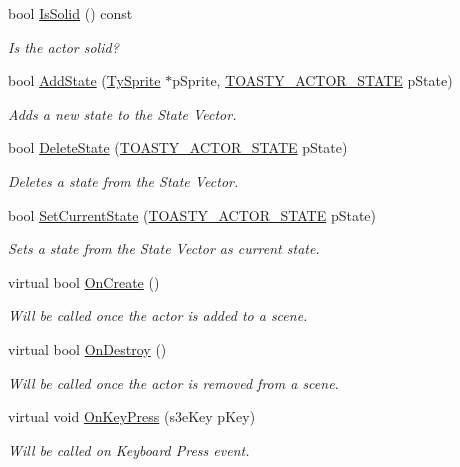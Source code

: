 \begin{DoxyCompactItemize}
bool \hyperlink{class_i_ty_actor_a5c1f9e77b0e5903c1f63ac5e2b2c42ad}{IsSolid} () const 
\begin{DoxyCompactList}\small\item\em Is the actor solid? \end{DoxyCompactList}\item 
bool \hyperlink{class_i_ty_actor_ab1fe7a1b509129bae41b55883c2c698a}{AddState} (\hyperlink{class_ty_sprite}{TySprite} $\ast$pSprite, \hyperlink{_ty_actor_8h_aceba83227db82b051b04ff8e90d63a51}{TOASTY\_\-ACTOR\_\-STATE} pState)
\begin{DoxyCompactList}\small\item\em Adds a new state to the State Vector. \end{DoxyCompactList}\item 
bool \hyperlink{class_i_ty_actor_a64f9104dbcf4bccbc17121d81b40c9cb}{DeleteState} (\hyperlink{_ty_actor_8h_aceba83227db82b051b04ff8e90d63a51}{TOASTY\_\-ACTOR\_\-STATE} pState)
\begin{DoxyCompactList}\small\item\em Deletes a state from the State Vector. \end{DoxyCompactList}\item 
bool \hyperlink{class_i_ty_actor_ab7a324bf10f138f537fe2b869d3aeea5}{SetCurrentState} (\hyperlink{_ty_actor_8h_aceba83227db82b051b04ff8e90d63a51}{TOASTY\_\-ACTOR\_\-STATE} pState)
\begin{DoxyCompactList}\small\item\em Sets a state from the State Vector as current state. \end{DoxyCompactList}\item 
virtual bool \hyperlink{class_i_ty_actor_aeff5d073d59e661d58e9bdc72370769c}{OnCreate} ()
\begin{DoxyCompactList}\small\item\em Will be called once the actor is added to a scene. \end{DoxyCompactList}\item 
virtual bool \hyperlink{class_i_ty_actor_a1ceb6a35987a22acb85bdaf9fd23f349}{OnDestroy} ()
\begin{DoxyCompactList}\small\item\em Will be called once the actor is removed from a scene. \end{DoxyCompactList}\item 
virtual void \hyperlink{class_i_ty_actor_a3a3295eba0fc092e44a9b690d2d242ab}{OnKeyPress} (s3eKey pKey)
\begin{DoxyCompactList}\small\item\em Will be called on Keyboard Press event. \end{DoxyCompactList}\item 

\end{DoxyCompactItemize}
